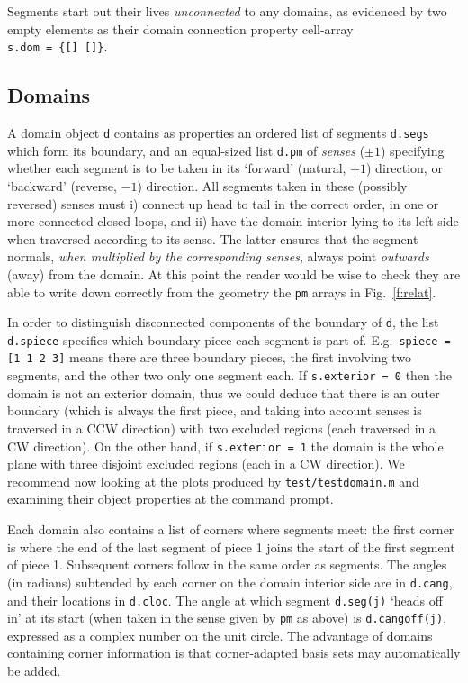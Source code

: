 \documentclass[12pt]{article}
\begin{document}
Segments start out their lives {\em unconnected} to any domains,
as evidenced by two empty elements as their domain connection
property cell-array \\
\verb?s.dom = {[] []}?.

\subsection{Domains}

A domain object {\tt d} contains as properties
an ordered list of segments {\tt d.segs} which form its
boundary, and an equal-sized
list {\tt d.pm} of {\em senses} ($\pm1$)
specifying whether each segment is to be taken in its `forward'
(natural, $+1$) direction, or `backward' (reverse, $-1$) direction.
All segments taken in these (possibly reversed) senses must
i) connect up head to tail in the correct order,
in one or more connected closed loops,
and ii) have the domain interior lying to its left side when traversed
according to its sense.
The latter ensures that the segment normals, {\em when multiplied by the
corresponding senses}, always point {\em outwards} (away) from
the domain.
At this point the reader would be wise to
check they are able to write down correctly from the geometry
the {\tt pm} arrays in Fig.~\ref{f:relat}.

In order to distinguish disconnected components of the boundary of
{\tt d}, the list {\tt d.spiece} specifies which boundary piece each
segment is part of. E.g.\ {\tt spiece = [1 1 2 3]} means
there are three boundary pieces, the first involving
two segments, and the other two only one segment each.
If {\tt s.exterior = 0}
then the domain is not an exterior domain, thus we could deduce that
there is an outer boundary (which is always the first piece, and 
taking into account senses is traversed in a CCW direction)
with two excluded regions (each traversed in a CW direction).
On the other hand, if {\tt s.exterior = 1} the domain is the whole plane
with three disjoint excluded regions (each in a CW direction).
We recommend now looking at the plots produced by
{\tt test/testdomain.m} and examining their object properties
at the command prompt.

Each domain also contains a list of corners where segments meet:
the first corner is where the
end of the last segment of piece 1 joins the start of the first segment
of piece 1. Subsequent corners follow in the same order as segments.
The angles (in radians) subtended by each 
corner on the domain interior side are in {\tt d.cang}, and their
locations in {\tt d.cloc}.
The angle at which segment {\tt d.seg(j)}
`heads off in' at its start (when taken in the sense given by
{\tt pm} as above) is {\tt d.cangoff(j)},
expressed as a complex number on the unit circle.
The advantage of domains containing corner information is that
corner-adapted basis sets may automatically be added.
\end{document}
